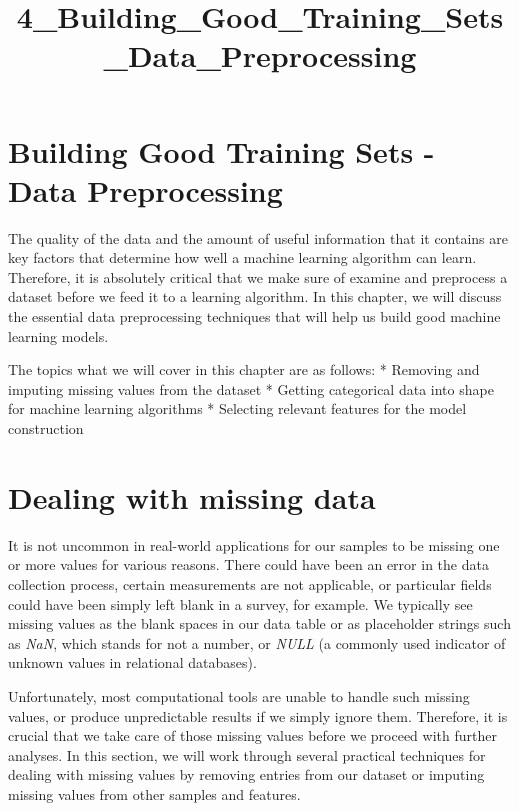 \documentclass[11pt]{article}
\title{4\_Building\_Good\_Training\_Sets\_Data\_Preprocessing}
\begin{document}
    
    
    \maketitle
    
    

    
    \section{Building Good Training Sets - Data
Preprocessing}\label{building-good-training-sets---data-preprocessing}

    The quality of the data and the amount of useful information that it
contains are key factors that determine how well a machine learning
algorithm can learn. Therefore, it is absolutely critical that we make
sure of examine and preprocess a dataset before we feed it to a learning
algorithm. In this chapter, we will discuss the essential data
preprocessing techniques that will help us build good machine learning
models.

The topics what we will cover in this chapter are as follows: * Removing
and imputing missing values from the dataset * Getting categorical data
into shape for machine learning algorithms * Selecting relevant features
for the model construction

    \section{Dealing with missing data}\label{dealing-with-missing-data}

    It is not uncommon in real-world applications for our samples to be
missing one or more values for various reasons. There could have been an
error in the data collection process, certain measurements are not
applicable, or particular fields could have been simply left blank in a
survey, for example. We typically see missing values as the blank spaces
in our data table or as placeholder strings such as \emph{NaN}, which
stands for not a number, or \emph{NULL} (a commonly used indicator of
unknown values in relational databases).

Unfortunately, most computational tools are unable to handle such
missing values, or produce unpredictable results if we simply ignore
them. Therefore, it is crucial that we take care of those missing values
before we proceed with further analyses. In this section, we will work
through several practical techniques for dealing with missing values by
removing entries from our dataset or imputing missing values from other
samples and features.
\end{document}
